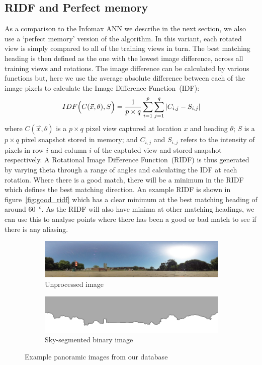 \documentclass[letterpaper]{article}
\begin{document}
\subsection{RIDF and Perfect memory}
\label{sec:ridf_perfect_memory}
As a comparison to the Infomax ANN we describe in the next section, we also use a `perfect memory' version of the algorithm. 
In this variant, each rotated view is simply compared to all of the training views in turn. 
The best matching heading is then defined as the one with the lowest image difference, across all training views and rotations. 
The image difference can be calculated by various functions but, here we use the average absolute difference between each of the image pixels to calculate the Image Difference Function~(IDF):
%
\begin{align}
    IDF\Bigl(C(\vec{x}, \theta), S\Bigr) = \frac{1}{p \times q} \sum\limits_{i=1}^p{\sum\limits_{j=1}^q|{C_{i,j} - S_{i,j}|}}
\end{align}
%
where $C(\vec{x}, \theta)$ is a $p \times q$ pixel view captured at location $x$ and heading $\theta$; $S$ is a $p \times q$ pixel snapshot stored in memory; and $C_{i,j}$ and $S_{i,j}$ refers to the intensity of pixels in row $i$ and column $i$ of the captuted view and stored snapshot respectively.
A Rotational Image Difference Function~(RIDF) is thus generated by varying theta through a range of angles and calculating the IDF at each rotation. 
Where there is a good match, there will be a minimum in the RIDF which defines the best matching direction. 
An example RIDF is shown in figure~\ref{fig:good_ridf} which has a clear minimum at the best matching heading of around \SI{60}{\degree}.
As the RIDF will also have minima at other matching headings, we can use this to analyse points where there has been a good or bad match to see if there is any aliasing.  

\begin{figure}[t]
    \begin{subfigure}[b]{\columnwidth}
        \includegraphics[width=\columnwidth]{figures/360_240.jpg}
        \caption{Unprocessed image}
    \end{subfigure}
    \begin{subfigure}[b]{\columnwidth}
        \includegraphics[width=\columnwidth]{figures/360_240_mask.png}
        \caption{Sky-segmented binary image}
    \end{subfigure}
    \caption{Example panoramic images from our database}
    \label{fig:database_images}
\end{figure}
\end{document}
